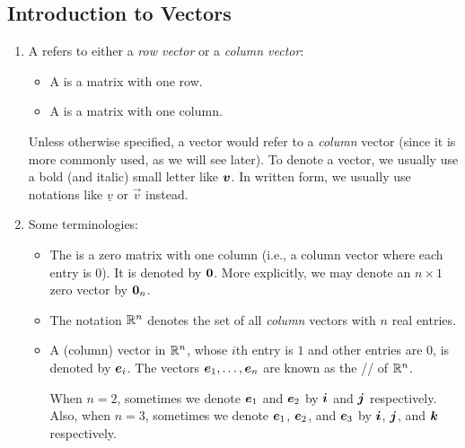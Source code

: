\subsection{Introduction to Vectors}
\begin{enumerate}
\item A  refers to either a \emph{row vector} or a \emph{column
vector}:
\begin{itemize}
\item A  is a matrix with one row.
\item A  is a matrix with one column.
\end{itemize}
Unless otherwise specified, a vector would refer to a \emph{column} vector
(since it is more commonly used, as we will see later). To denote a vector, we
usually use a bold (and italic) small letter like \(\vb*{v}\). In written
form, we usually use notations like \(\underline{v}\) or \(\vec{v}\) instead.

\item Some terminologies:
\begin{itemize}
\item The  is a zero matrix with one column (i.e., a column
vector where each entry is \(0\)). It is denoted by \(\vb*{0}\). More explicitly, we may denote an \(n\times 1\) zero vector by \(\vb*{0}_{n}\).
\item The notation \(\mathbb{R}^n\) denotes the set of all \emph{column} vectors with \(n\)
real entries.
\item A (column) vector in \(\mathbb{R}^n\), whose \(i\)th entry is \(1\) and other
entries are \(0\), is denoted by \(\vb*{e}_{i}\). The vectors
\(\vb*{e}_{1},\dotsc,\vb*{e}_{n}\) are known as the // of
\(\mathbb{R}^n\).

\begin{note}
When \(n=2\), sometimes we denote \(\vb*{e}_{1}\) and \(\vb*{e}_{2}\) by
\(\vb*{i}\) and \(\vb*{j}\) respectively. Also, when \(n=3\), sometimes we
denote \(\vb*{e}_{1}\), \(\vb*{e}_{2}\), and \(\vb*{e}_{3}\) by
\(\vb*{i}\), \(\vb*{j}\), and \(\vb*{k}\) respectively.
\end{note}
\end{itemize}


\end{enumerate}
